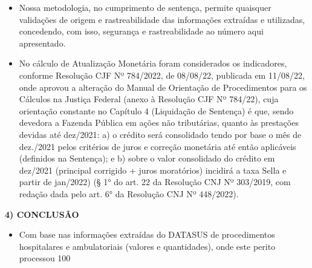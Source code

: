\documentclass{article}
\begin{document}
\begin{landscape}
\begin{itemize}
    \item Nossa metodologia, no cumprimento de sentença, permite quaisquer validações de origem e rastreabilidade das informações extraídas e utilizadas, concedendo, com isso, segurança e rastreabilidade ao número aqui apresentado.

    \item No cálculo de Atualização Monetária foram considerados os indicadores, conforme Resolução CJF Nº 784/2022, de 08/08/22, publicada em 11/08/22, onde aprovou a alteração do Manual de Orientação de Procedimentos para os Cálculos na Justiça Federal (anexo à Resolução CJF Nº 784/22), cuja orientação constante no Capítulo 4 (Liquidação de Sentença) é que, sendo devedora a Fazenda Pública em ações não tributárias, quanto às prestações devidas até dez/2021: a) o crédito será consolidado tendo por base o mês de dez./2021 pelos critérios de juros e correção monetária até então aplicáveis (definidos na Sentença); e b) sobre o valor consolidado do crédito em dez/2021 (principal corrigido + juros moratórios) incidirá a taxa Sella e partir de jan/2022) (§ 1° do art. 22 da Resolução CNJ Nº 303/2019, com redação dada pelo art. 6° da Resolução CNJ Nº 448/2022).
    \end{itemize}

    \vspace{10mm}

    \textbf{4) CONCLUSÃO}

    \begin{itemize}
    \item Com base nas informações extraídas do DATASUS de procedimentos hospitalares e ambulatoriais (valores e quantidades), onde este perito processou 100\\%
    \end{itemize}


\end{landscape}
\end{document}
